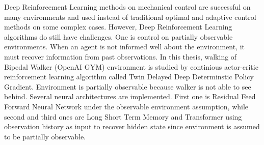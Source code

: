 Deep Reinforcement Learning methods on mechanical control are successful on many environments and used instead of traditional optimal and adaptive control methods on some complex cases. However, Deep Reinforcement Learning algorithms do still have challenges. One is control on partially observable environments. When an agent is not informed well about the environment, it must recover information from past observations. In this thesis, walking of Bipedal Walker (OpenAI GYM) environment is studied by continious actor-critic reinforcement learning algorithm called Twin Delayed Deep Determinstic Policy Gradient. Environment is partially observable because walker is not able to see behind. Several neural architectures are implemented. First one is Residual Feed Forward Neural Network under the observable environment assumption, while second and third ones are Long Short Term Memory and Transformer using observation history as input to recover hidden state since environment is assumed to be partially observable.



